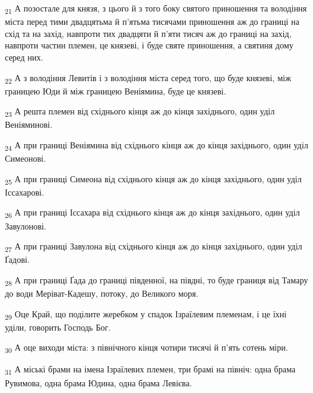 \begin{tcolorbox}
\textsubscript{21} А позостале для князя, з цього й з того боку святого приношення та володіння міста перед тими двадцятьма й п'ятьма тисячами приношення аж до границі на схід та на захід, навпроти тих двадцяти й п'яти тисяч аж до границі на захід, навпроти частин племен, це князеві, і буде святе приношення, а святиня дому серед них.
\end{tcolorbox}
\begin{tcolorbox}
\textsubscript{22} А з володіння Левитів і з володіння міста серед того, що буде князеві, між границею Юди й між границею Веніямина, буде це князеві.
\end{tcolorbox}
\begin{tcolorbox}
\textsubscript{23} А решта племен від східнього кінця аж до кінця західнього, один уділ Веніяминові.
\end{tcolorbox}
\begin{tcolorbox}
\textsubscript{24} А при границі Веніямина від східнього кінця аж до кінця західнього, один уділ Симеонові.
\end{tcolorbox}
\begin{tcolorbox}
\textsubscript{25} А при границі Симеона від східнього кінця аж до кінця західнього, один уділ Іссахарові.
\end{tcolorbox}
\begin{tcolorbox}
\textsubscript{26} А при границі Іссахара від східнього кінця аж до кінця західнього, один уділ Завулонові.
\end{tcolorbox}
\begin{tcolorbox}
\textsubscript{27} А при границі Завулона від східнього кінця аж до кінця західнього, один уділ Ґадові.
\end{tcolorbox}
\begin{tcolorbox}
\textsubscript{28} А при границі Ґада до границі південної, на півдні, то буде границя від Тамару до води Меріват-Кадешу, потоку, до Великого моря.
\end{tcolorbox}
\begin{tcolorbox}
\textsubscript{29} Оце Край, що поділите жеребком у спадок Ізраїлевим племенам, і це їхні уділи, говорить Господь Бог.
\end{tcolorbox}
\begin{tcolorbox}
\textsubscript{30} А оце виходи міста: з північного кінця чотири тисячі й п'ять сотень міри.
\end{tcolorbox}
\begin{tcolorbox}
\textsubscript{31} А міські брами на імена Ізраїлевих племен, три брамі на північ: одна брама Рувимова, одна брама Юдина, одна брама Левієва.
\end{tcolorbox}
